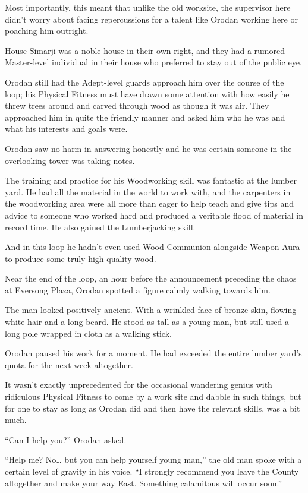 \documentclass[a4paper,10pt]{book}
\begin{document}
Most importantly, this meant that unlike the old worksite, the supervisor here didn’t worry about facing repercussions for a talent like Orodan working here or poaching him outright.\par
House Simarji was a noble house in their own right, and they had a rumored Master-level individual in their house who preferred to stay out of the public eye.\par
Orodan still had the Adept-level guards approach him over the course of the loop; his Physical Fitness must have drawn some attention with how easily he threw trees around and carved through wood as though it was air. They approached him in quite the friendly manner and asked him who he was and what his interests and goals were.\par
Orodan saw no harm in answering honestly and he was certain someone in the overlooking tower was taking notes.\par
The training and practice for his Woodworking skill was fantastic at the lumber yard. He had all the material in the world to work with, and the carpenters in the woodworking area were all more than eager to help teach and give tips and advice to someone who worked hard and produced a veritable flood of material in record time. He also gained the Lumberjacking skill.\par
And in this loop he hadn’t even used Wood Communion alongside Weapon Aura to produce some truly high quality wood.\par
Near the end of the loop, an hour before the announcement preceding the chaos at Eversong Plaza, Orodan spotted a figure calmly walking towards him.\par
The man looked positively ancient. With a wrinkled face of bronze skin, flowing white hair and a long beard. He stood as tall as a young man, but still used a long pole wrapped in cloth as a walking stick.\par
Orodan paused his work for a moment. He had exceeded the entire lumber yard’s quota for the next week altogether.\par
It wasn’t exactly unprecedented for the occasional wandering genius with ridiculous Physical Fitness to come by a work site and dabble in such things, but for one to stay as long as Orodan did and then have the relevant skills, was a bit much.\par
“Can I help you?” Orodan asked.\par
“Help me? No… but you can help yourself young man,” the old man spoke with a certain level of gravity in his voice. “I strongly recommend you leave the County altogether and make your way East. Something calamitous will occur soon.”\par
\end{document}
